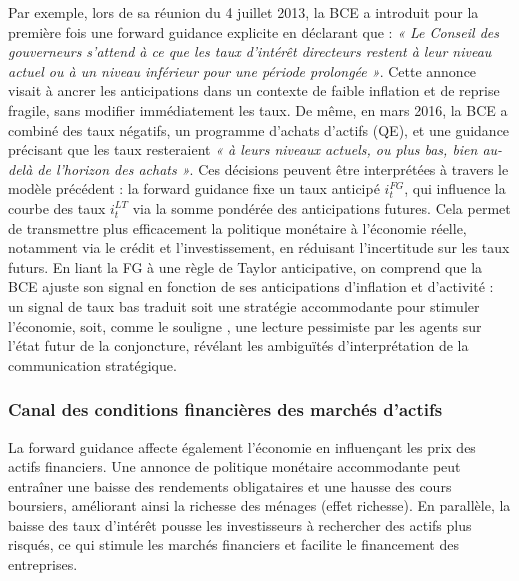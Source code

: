Par exemple, lors de sa réunion du 4 juillet 2013, la BCE a introduit pour la première fois une forward guidance explicite en déclarant que : \textit{« Le Conseil des gouverneurs s’attend à ce que les taux d’intérêt directeurs restent à leur niveau actuel ou à un niveau inférieur pour une période prolongée »}. Cette annonce visait à ancrer les anticipations dans un contexte de faible inflation et de reprise fragile, sans modifier immédiatement les taux. De même, en mars 2016, la BCE a combiné des taux négatifs, un programme d’achats d’actifs (QE), et une guidance précisant que les taux resteraient \textit{« à leurs niveaux actuels, ou plus bas, bien au-delà de l’horizon des achats »}. Ces décisions peuvent être interprétées à travers le modèle précédent : la forward guidance fixe un taux anticipé $i_t^{FG}$, qui influence la courbe des taux $i_t^{LT}$ via la somme pondérée des anticipations futures. Cela permet de transmettre plus efficacement la politique monétaire à l’économie réelle, notamment via le crédit et l’investissement, en réduisant l’incertitude sur les taux futurs. En liant la FG à une règle de Taylor anticipative, on comprend que la BCE ajuste son signal en fonction de ses anticipations d’inflation et d’activité : un signal de taux bas traduit soit une stratégie accommodante pour stimuler l’économie, soit, comme le souligne \citep{andrade2019}, une lecture pessimiste par les agents sur l’état futur de la conjoncture, révélant les ambiguïtés d’interprétation de la communication stratégique.

\subsubsection{Canal des conditions financières des marchés d'actifs}

La forward guidance affecte également l'économie en influençant les prix des actifs financiers. Une annonce de politique monétaire accommodante peut entraîner une baisse des rendements obligataires et une hausse des cours boursiers, améliorant ainsi la richesse des ménages (effet richesse). En parallèle, la baisse des taux d'intérêt pousse les investisseurs à rechercher des actifs plus risqués, ce qui stimule les marchés financiers et facilite le financement des entreprises.\\

